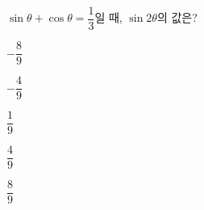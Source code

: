 $\sin\theta+\cos\theta=\dfrac{1}{3}$일 때, $\sin 2\theta$의 값은?
\begin{choices32}{\rule[-3ex]{0pt}{8ex}$-\dfrac{8}{9}$}{\rule[-3ex]{0pt}{8ex}$-\dfrac{4}{9}$}{\rule[-3ex]{0pt}{8ex}$\dfrac{1}{9}$}{\rule[-3ex]{0pt}{8ex}$\dfrac{4}{9}$}{\rule[-3ex]{0pt}{8ex}$\dfrac{8}{9}$}\end{choices32}
